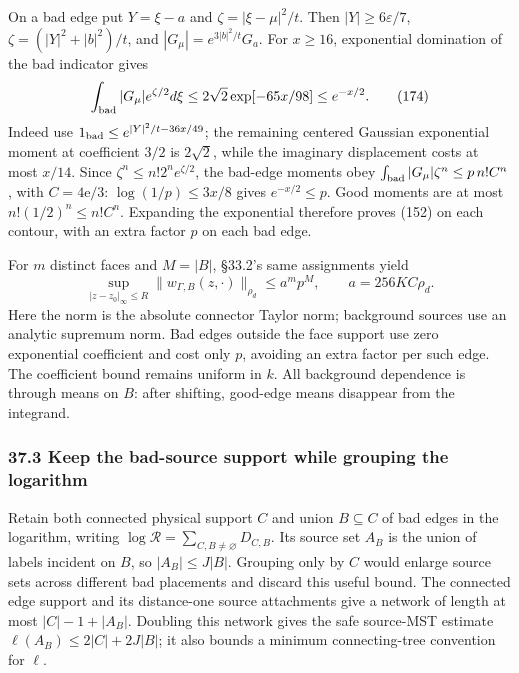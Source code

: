 \documentclass[11pt,a4paper]{article}
\begin{document}
On a bad edge put \(Y=\xi-a\) and \(\zeta=|\xi-\mu|^2/t\). Then
\(|Y|\ge6\varepsilon/7\), \(\zeta=(|Y|^2+|b|^2)/t\), and
\(|G_\mu|=e^{3|b|^2/t}G_a\). For \(x\ge16\), exponential domination of
the bad indicator gives \[\int_{\rm bad}|G_\mu|e^{\zeta/2}d\xi
 \le2\sqrt2\exp[-65x/98]\le e^{-x/2}.\tag{174}\] Indeed use
\(1_{\rm bad}\le e^{|Y|^2/t-36x/49}\); the remaining centered Gaussian
exponential moment at coefficient \(3/2\) is \(2\sqrt2\), while the
imaginary displacement costs at most \(x/14\). Since
\(\zeta^n\le n!2^n e^{\zeta/2}\), the bad-edge moments obey
\(\int_{\rm bad}|G_\mu|\zeta^n\le p\,n!C^n\), with \(C=4\mathrm e/3\):
\(\log(1/p)\le3x/8\) gives \(e^{-x/2}\le p\). Good moments are at most
\(n!(1/2)^n\le n!C^n\). Expanding the exponential therefore proves (152)
on each contour, with an extra factor \(p\) on each bad edge.

For \(m\) distinct faces and \(M=|B|\), §33.2's same assignments yield
\[\sup_{|z-z_0|_\infty\le R}
 \|w_{\Gamma,B}(z,\cdot)\|_{\rho_d}
 \le a^m p^M,\qquad a=256KC\rho_d.\tag{175}\] Here the norm is the
absolute connector Taylor norm; background sources use an analytic
supremum norm. Bad edges outside the face support use zero exponential
coefficient and cost only \(p\), avoiding an extra factor per such edge.
The coefficient bound remains uniform in \(k\). All background
dependence is through means on \(B\): after shifting, good-edge means
disappear from the integrand.

\hypertarget{keep-the-bad-source-support-while-grouping-the-logarithm}{%
\subsubsection{37.3 Keep the bad-source support while grouping the
logarithm}\label{keep-the-bad-source-support-while-grouping-the-logarithm}}

Retain both connected physical support \(C\) and union \(B\subseteq C\)
of bad edges in the logarithm, writing
\(\log\mathcal R=\sum_{C,B\ne\varnothing}D_{C,B}\). Its source set
\(A_B\) is the union of labels incident on \(B\), so \(|A_B|\le J|B|\).
Grouping only by \(C\) would enlarge source sets across different bad
placements and discard this useful bound. The connected edge support and
its distance-one source attachments give a network of length at most
\(|C|-1+|A_B|\). Doubling this network gives the safe source-MST
estimate \(\ell(A_B)\le2|C|+2J|B|\); it also bounds a minimum
connecting-tree convention for \(\ell\).
\end{document}
